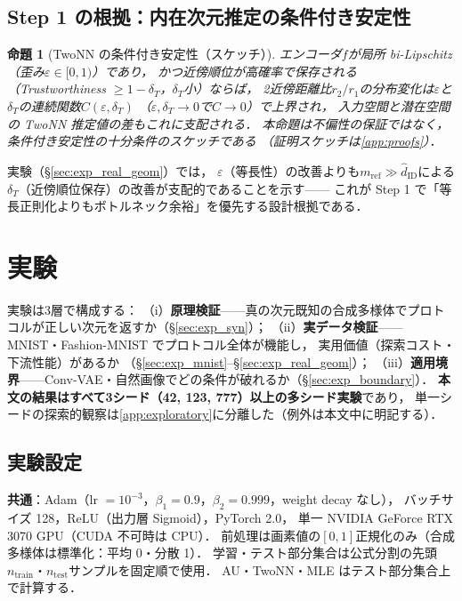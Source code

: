 \documentclass[11pt,a4paper]{jsarticle}
\newtheorem{proposition}{命題}
\newcommand{\hatdID}{\hat{d}_{\mathrm{ID}}}
\begin{document}
\subsection{Step 1 の根拠：内在次元推定の条件付き安定性}\label{sec:theory_twonn}

\begin{proposition}[TwoNN の条件付き安定性（スケッチ）]\label{thm:twonn_stability}
エンコーダ$f$が局所 bi-Lipschitz（歪み$\varepsilon \in [0,1)$）であり，
かつ近傍順位が高確率で保存される（Trustworthiness $\geq 1 - \delta_T$，$\delta_T$小）ならば，
2近傍距離比$r_2/r_1$の分布変化は$\varepsilon$と$\delta_T$の連続関数$C(\varepsilon, \delta_T)$
（$\varepsilon, \delta_T \to 0$で$C \to 0$）で上界され，
入力空間と潜在空間の TwoNN 推定値の差もこれに支配される．
本命題は不偏性の保証ではなく，条件付き安定性の十分条件のスケッチである
（証明スケッチは\ref{app:proofs}）．
\end{proposition}

実験（§\ref{sec:exp_real_geom}）では，
$\varepsilon$（等長性）の改善よりも$m_{\mathrm{ref}} \gg \hatdID$による
$\delta_T$（近傍順位保存）の改善が支配的であることを示す——
これが Step 1 で「等長正則化よりもボトルネック余裕」を優先する設計根拠である．

\section{実験}\label{sec:exp}

実験は3層で構成する：
（i）\textbf{原理検証}——真の次元既知の合成多様体でプロトコルが正しい次元を返すか（§\ref{sec:exp_syn}）；
（ii）\textbf{実データ検証}——MNIST・Fashion-MNIST でプロトコル全体が機能し，
実用価値（探索コスト・下流性能）があるか
（§\ref{sec:exp_mnist}--§\ref{sec:exp_real_geom}）；
（iii）\textbf{適用境界}——Conv-VAE・自然画像でどの条件が破れるか（§\ref{sec:exp_boundary}）．
\textbf{本文の結果はすべて3シード（42, 123, 777）以上の多シード実験}であり，
単一シードの探索的観察は\ref{app:exploratory}に分離した（例外は本文中に明記する）．

\subsection{実験設定}\label{sec:exp_setup}

\textbf{共通}：Adam（lr $= 10^{-3}$，$\beta_1 = 0.9$，$\beta_2 = 0.999$，weight decay なし），
バッチサイズ 128，ReLU（出力層 Sigmoid），PyTorch 2.0，
単一 NVIDIA GeForce RTX 3070 GPU（CUDA 不可時は CPU）．
前処理は画素値の$[0,1]$正規化のみ（合成多様体は標準化：平均 0・分散 1）．
学習・テスト部分集合は公式分割の先頭$n_{\mathrm{train}}$・$n_{\mathrm{test}}$サンプルを固定順で使用．
AU・TwoNN・MLE はテスト部分集合上で計算する．
\end{document}
